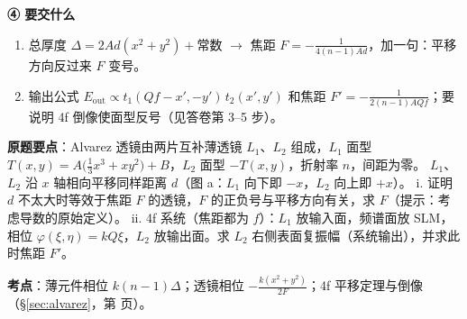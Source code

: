 \begin{idea}[读题：这道题在说什么]
\textbf{④ 要交什么}
\begin{enumerate}[label=\roman*.]
\item 总厚度 $\Delta=2Ad(x^2+y^2)+$常数 $\to$ 焦距 $F=-\frac{1}{4(n-1)Ad}$，加一句：平移方向反过来 $F$ 变号。
\item 输出公式 $E_{\text{out}}\propto t_1(Qf-x',-y')\,t_2(x',y')$ 和焦距 $F'=-\frac{1}{2(n-1)AQf}$；要说明 4f 倒像使面型反号（见答卷第 3–5 步）。
\end{enumerate}
\end{idea}

\noindent\textbf{原题要点}：Alvarez 透镜由两片互补薄透镜 $L_1$、$L_2$ 组成，$L_1$ 面型 $T(x,y)=A\big(\frac13x^3+xy^2\big)+B$，$L_2$ 面型 $-T(x,y)$，折射率 $n$，间距为零。
$L_1$、$L_2$ 沿 $x$ 轴相向平移同样距离 $d$（图 a：$L_1$ 向下即 $-x$，$L_2$ 向上即 $+x$）。
i. 证明 $d$ 不太大时等效于焦距 $F$ 的透镜，$F$ 的正负号与平移方向有关，求 $F$（提示：考虑导数的原始定义）。
ii. 4f 系统（焦距都为 $f$）：$L_1$ 放输入面，频谱面放 SLM，相位 $\varphi(\xi,\eta)=kQ\xi$，$L_2$ 放输出面。求 $L_2$ 右侧表面复振幅（系统输出），并求此时焦距 $F'$。

\textbf{考点}：薄元件相位 $k(n-1)\Delta$；透镜相位 $-\frac{k(x^2+y^2)}{2F}$；4f 平移定理与倒像（§\ref{sec:alvarez}，第 \pageref{sec:alvarez} 页）。

